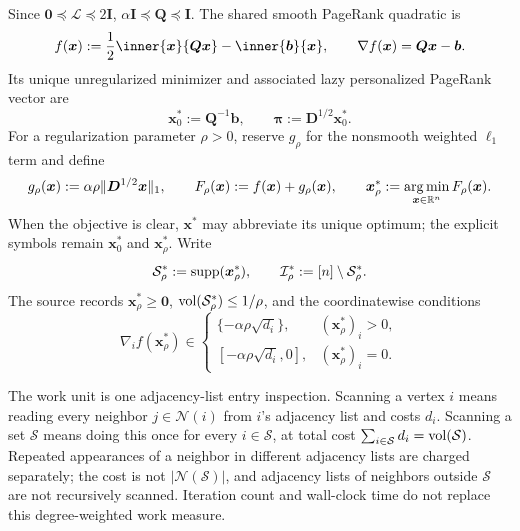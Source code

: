 \documentclass[11pt]{article}
\begin{document}
Since \(\bm{0}\preceq\bm{\mathcal L}\preceq2\bm{I}\),
\(\alpha\bm{I}\preceq\bm{Q}\preceq\bm{I}\). The shared smooth PageRank
quadratic is
\begin{equation}
    f(\bm{x}):=\frac12\inner{\bm{x}}{\bm{Q}\bm{x}}-\inner{\bm{b}}{\bm{x}},
    \qquad
    \nabla f(\bm{x})=\bm{Q}\bm{x}-\bm{b}.
    \label{eq:shared-pagerank-objective}
\end{equation}
Its unique unregularized minimizer and associated lazy personalized PageRank
vector are
\begin{equation}
    \bm{x}_0^*:=\bm{Q}^{-1}\bm{b},
    \qquad
    \bm{\pi}:=\bm{D}^{1/2}\bm{x}_0^*.
    \label{eq:shared-ppr-solution}
\end{equation}
For a regularization parameter \(\rho>0\), reserve \(g_\rho\) for the
nonsmooth weighted \(\ell_1\) term and define
\begin{equation}
    g_\rho(\bm{x}):=\alpha\rho\|\bm{D}^{1/2}\bm{x}\|_1,
    \qquad
    F_\rho(\bm{x}):=f(\bm{x})+g_\rho(\bm{x}),
    \qquad
    \bm{x}_\rho^*:=\operatorname*{arg\,min}_{\bm{x}\in\mathbb{R}^n}F_\rho(\bm{x}).
    \label{eq:shared-rppr-objective}
\end{equation}
When the objective is clear, \(\bm{x}^*\) may abbreviate its unique optimum;
the explicit symbols remain \(\bm{x}_0^*\) and \(\bm{x}_\rho^*\). Write
\[
    \mathcal{S}_\rho^*:=\operatorname{supp}(\bm{x}_\rho^*),
    \qquad
    \mathcal{I}_\rho^*:=[n]\setminus\mathcal{S}_\rho^*.
\]
The source records \(\bm{x}_\rho^*\geq\bm{0}\),
\(\operatorname{vol}(\mathcal{S}_\rho^*)\leq1/\rho\), and the coordinatewise conditions
\begin{equation}
    \nabla_i f(\bm{x}_\rho^*)
    \in
    \begin{cases}
        \{-\alpha\rho\sqrt{d_i}\}, & (\bm{x}_\rho^*)_i>0,\\
        [-\alpha\rho\sqrt{d_i},0], & (\bm{x}_\rho^*)_i=0.
    \end{cases}
    \label{eq:shared-rppr-kkt}
\end{equation}

The work unit is one adjacency-list entry inspection. Scanning a vertex \(i\)
means reading every neighbor \(j\in\mathcal N(i)\) from \(i\)'s adjacency
list and costs \(d_i\). Scanning a set \(\mathcal{S}\) means doing this once
for every \(i\in\mathcal{S}\), at total cost
\(\sum_{i\in\mathcal{S}}d_i=\operatorname{vol}(\mathcal{S})\). Repeated appearances of a
neighbor in different adjacency lists are charged separately; the cost is not
\(|\mathcal N(\mathcal{S})|\), and adjacency lists of neighbors outside
\(\mathcal{S}\) are not recursively scanned. Iteration count and wall-clock
time do not replace this degree-weighted work measure.
\end{document}

